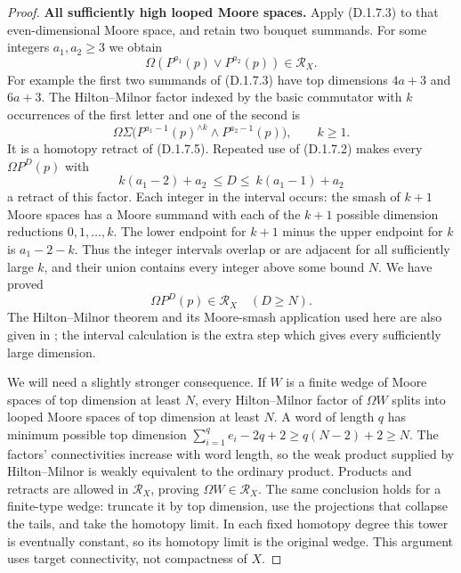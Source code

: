 \begin{proof}
\medskip\noindent
\textbf{All sufficiently high looped Moore spaces.}
Apply (D.1.7.3) to that even-dimensional Moore space, and retain
two bouquet summands. For some integers $a_1,a_2\geq3$ we obtain
\[
 \Omega(P^{a_1}(p)\vee P^{a_2}(p))\in\mathcal R_X.
 \tag{D.1.7.5}
\]
For example the first two summands of (D.1.7.3) have top
dimensions $4a+3$ and $6a+3$.
The Hilton--Milnor factor indexed by the basic commutator with
$k$ occurrences of the first letter and one of the second is
\[
 \Omega\Sigma\bigl(
      P^{a_1-1}(p)^{\wedge k}\wedge P^{a_2-1}(p)\bigr),
      \qquad k\geq1.
\]
It is a homotopy retract of (D.1.7.5). Repeated use of
(D.1.7.2) makes every $\Omega P^D(p)$ with
\[
        k(a_1-2)+a_2\ \leq D\leq\ k(a_1-1)+a_2
 \tag{D.1.7.6}
\]
a retract of this factor. Each integer in the interval occurs:
the smash of $k+1$ Moore spaces has a Moore summand with each of
the $k+1$ possible dimension reductions $0,1,\ldots,k$.
The lower endpoint for $k+1$ minus the upper endpoint for $k$
is $a_1-2-k$. Thus the integer intervals overlap or are adjacent
for all sufficiently large $k$, and their union contains every
integer above some bound $N$. We have proved
\[
                  \Omega P^D(p)\in\mathcal R_X
                  \quad(D\geq N).                  \tag{D.1.7.7}
\]
The Hilton--Milnor theorem and its Moore-smash application used
here are also given in \cite[Proposition~2.2 and its proof,
pp.~18--19]{I_CMN1987}; the interval calculation is the extra
step which gives every sufficiently large dimension.

We will need a slightly stronger consequence. If $W$ is a finite
wedge of Moore spaces of top dimension at least $N$, every
Hilton--Milnor factor of $\Omega W$ splits into looped Moore
spaces of top dimension at least $N$. A word of length $q$ has
minimum possible top dimension
$\sum_{i=1}^q e_i-2q+2\geq q(N-2)+2\geq N$.
The factors' connectivities increase with word length, so the
weak product supplied by Hilton--Milnor is weakly equivalent to
the ordinary product. Products and retracts are allowed in
$\mathcal R_X$, proving $\Omega W\in\mathcal R_X$.
The same conclusion holds for a finite-type wedge: truncate it
by top dimension, use the projections that collapse the tails,
and take the homotopy limit. In each fixed homotopy degree this
tower is eventually constant, so its homotopy limit is the
original wedge. This argument uses target connectivity, not
compactness of $X$.


\end{proof}
